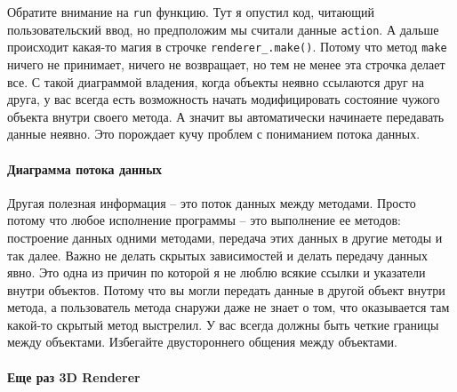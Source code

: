 Обратите внимание на \verb"run" функцию.
Тут я опустил код, читающий пользовательский ввод, но предположим мы считали данные \verb"action".
А дальше происходит какая-то магия в строчке \verb"renderer_.make()".
Потому что метод \verb"make" ничего не принимает, ничего не возвращает, но тем не менее эта строчка делает все.
С такой диаграммой владения, когда объекты неявно ссылаются друг на друга, у вас всегда есть возможность начать модифицировать состояние чужого объекта внутри своего метода.
А значит вы автоматически начинаете передавать данные неявно.
Это порождает кучу проблем с пониманием потока данных.

\paragraph{Диаграмма потока данных}

Другая полезная информация -- это поток данных между методами.
Просто потому что любое исполнение программы -- это выполнение ее методов: построение данных одними методами, передача этих данных в другие методы и так далее.
Важно не делать скрытых зависимостей и делать передачу данных явно.
Это одна из причин по которой я не люблю всякие ссылки и указатели внутри объектов.
Потому что вы могли передать данные в другой объект внутри метода, а пользователь метода снаружи даже не знает о том, что оказывается там какой-то скрытый метод выстрелил.
У вас всегда должны быть четкие границы между объектами.
Избегайте двустороннего общения между объектами.

\paragraph{Еще раз 3D Renderer}

